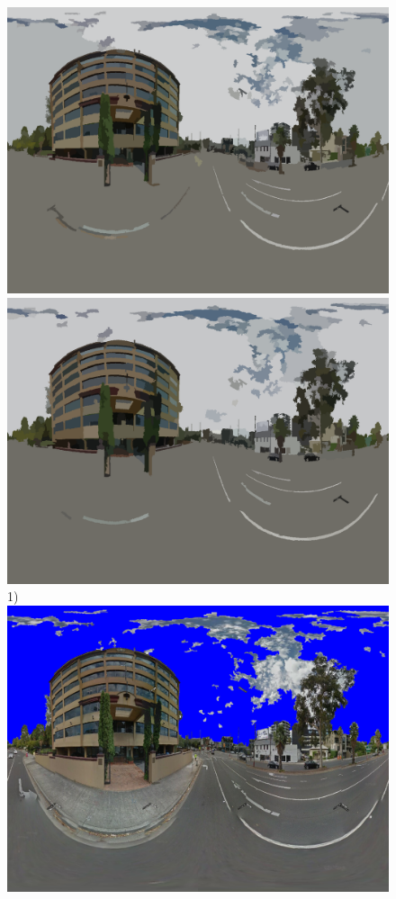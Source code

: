 \documentclass{article}
\begin{document}
\begin{figure}
\textbf{}\includegraphics[scale=0.08]{Images/mean/4880_5_7_210.png} 
\textbf{}\includegraphics[scale=0.08]{Images/mean/4880_7_8_300.png} \scriptsize{1)}
\textbf{}\includegraphics[scale=0.08]{Images/mean/4880_3_6_100_ms_sky_mark.png} 

\end{figure}
\end{document}
